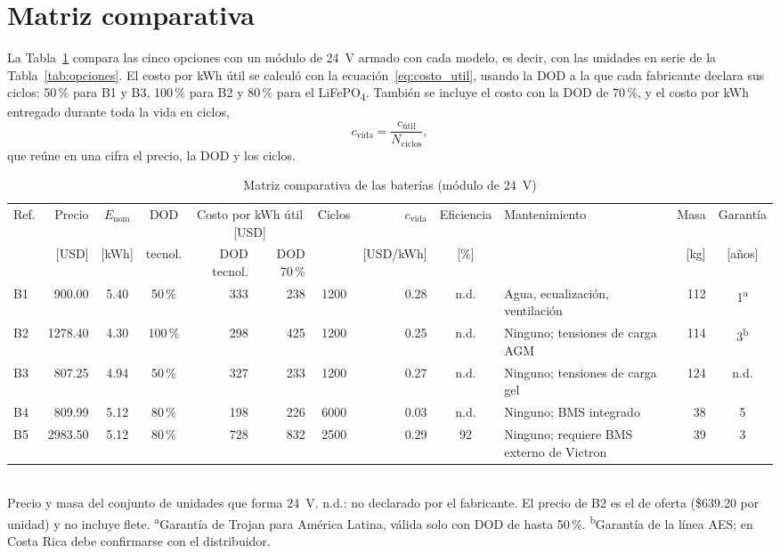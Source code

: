 \section{Matriz comparativa}\label{sec:matriz}

La Tabla~\ref{tab:matriz} compara las cinco opciones con un módulo de \SI{24}{V} armado con cada modelo, es decir, con las unidades en serie de la Tabla~\ref{tab:opciones}. El costo por kWh útil se calculó con la ecuación~\eqref{eq:costo_util}, usando la DOD a la que cada fabricante declara sus ciclos: 50\,\% para B1 y B3, 100\,\% para B2 y 80\,\% para el LiFePO\textsubscript{4}. También se incluye el costo con la DOD de 70\,\%, y el costo por kWh entregado durante toda la vida en ciclos,
\begin{equation}
c_{\text{vida}} = \frac{c_{\text{útil}}}{N_{\text{ciclos}}},
\label{eq:costo_vida}
\end{equation}
que reúne en una cifra el precio, la DOD y los ciclos.

\begin{table}[!th]
\caption{Matriz comparativa de las baterías (módulo de \SI{24}{V})}
\label{tab:matriz}
\centering
\footnotesize
\setlength{\tabcolsep}{4pt}
\begin{tabular}{l r c c r r c r c >{\raggedright\arraybackslash}p{} r c}
\toprule
Ref. & Precio & $E_{\text{nom}}$ & DOD & \multicolumn{2}{c}{Costo por kWh útil [USD]} & Ciclos & $c_{\text{vida}}$ & Eficiencia & Mantenimiento & Masa & Garantía \\
\cmidrule(lr){5-6}
 & [USD] & [kWh] & tecnol. & DOD tecnol. & DOD 70\,\% & & [USD/kWh] & [\%] & & [kg] & [años] \\
\midrule
B1 & 900.00 & 5.40 & 50\,\% & 333 & 238 & 1200 & 0.28 & n.d. & Agua, ecualización, ventilación & 112 & 1\textsuperscript{a} \\
B2 & 1278.40 & 4.30 & 100\,\% & 298 & 425 & 1200 & 0.25 & n.d. & Ninguno; tensiones de carga AGM & 114 & 3\textsuperscript{b} \\
B3 & 807.25 & 4.94 & 50\,\% & 327 & 233 & 1200 & 0.27 & n.d. & Ninguno; tensiones de carga gel & 124 & n.d. \\
B4 & 809.99 & 5.12 & 80\,\% & 198 & 226 & 6000 & 0.03 & n.d. & Ninguno; BMS integrado & 38 & 5 \\
B5 & 2983.50 & 5.12 & 80\,\% & 728 & 832 & 2500 & 0.29 & 92 & Ninguno; requiere BMS externo de Victron & 39 & 3 \\
\bottomrule
\end{tabular}
\\[2pt]
{\footnotesize Precio y masa del conjunto de unidades que forma \SI{24}{V}. n.d.: no declarado por el fabricante. El precio de B2 es el de oferta (\$639.20 por unidad) y no incluye flete.
\textsuperscript{a}Garantía de Trojan para América Latina, válida solo con DOD de hasta 50\,\%. \textsuperscript{b}Garantía de la línea AES; en Costa Rica debe confirmarse con el distribuidor.}
\end{table}


